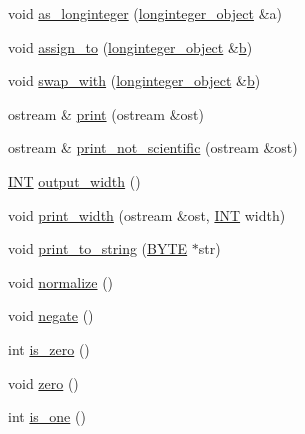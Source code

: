 \begin{DoxyCompactItemize}
\item 
void \mbox{\hyperlink{classlonginteger__object_af897a2019089bccd058062603480b8f9}{as\+\_\+longinteger}} (\mbox{\hyperlink{classlonginteger__object}{longinteger\+\_\+object}} \&a)
\item 
void \mbox{\hyperlink{classlonginteger__object_a891b9d0947bfce181245ab5cffe9482a}{assign\+\_\+to}} (\mbox{\hyperlink{classlonginteger__object}{longinteger\+\_\+object}} \&\mbox{\hyperlink{alphabet2_8_c_a148e3876077787926724625411d6e7a9}{b}})
\item 
void \mbox{\hyperlink{classlonginteger__object_ad5b3a13ab9dd9194219627600890aed5}{swap\+\_\+with}} (\mbox{\hyperlink{classlonginteger__object}{longinteger\+\_\+object}} \&\mbox{\hyperlink{alphabet2_8_c_a148e3876077787926724625411d6e7a9}{b}})
\item 
ostream \& \mbox{\hyperlink{classlonginteger__object_a73cc30b986d4e9301bfb5562a09607f8}{print}} (ostream \&ost)
\item 
ostream \& \mbox{\hyperlink{classlonginteger__object_ab80ea5c103cf97de662da3f1c79b2dd4}{print\+\_\+not\+\_\+scientific}} (ostream \&ost)
\item 
\mbox{\hyperlink{galois_8h_a09fddde158a3a20bd2dcadb609de11dc}{I\+NT}} \mbox{\hyperlink{classlonginteger__object_a5d4daf2db78de4c3e12aacfd4ac558af}{output\+\_\+width}} ()
\item 
void \mbox{\hyperlink{classlonginteger__object_a36a64729f6603815c359b0d6c9673478}{print\+\_\+width}} (ostream \&ost, \mbox{\hyperlink{galois_8h_a09fddde158a3a20bd2dcadb609de11dc}{I\+NT}} width)
\item 
void \mbox{\hyperlink{classlonginteger__object_abf29fedc2ef57bb6c8bcc8e1f052efda}{print\+\_\+to\+\_\+string}} (\mbox{\hyperlink{galois_8h_ab6cc7b4aeb6ea31aba2b3fbfc83ff5e6}{B\+Y\+TE}} $\ast$str)
\item 
void \mbox{\hyperlink{classlonginteger__object_ae27040d862a5624e98fc9582daa889ee}{normalize}} ()
\item 
void \mbox{\hyperlink{classlonginteger__object_aa2305cd4d3ee6e462c70c40acc61a6af}{negate}} ()
\item 
int \mbox{\hyperlink{classlonginteger__object_a0946732d08e5180a00480f4c40667101}{is\+\_\+zero}} ()
\item 
void \mbox{\hyperlink{classlonginteger__object_a6cdf946c2eb5e3e71ffb534716fa8a86}{zero}} ()
\item 
int \mbox{\hyperlink{classlonginteger__object_adeab597c8bb66f36eb085f046d1df656}{is\+\_\+one}} ()
\item 

\end{DoxyCompactItemize}
